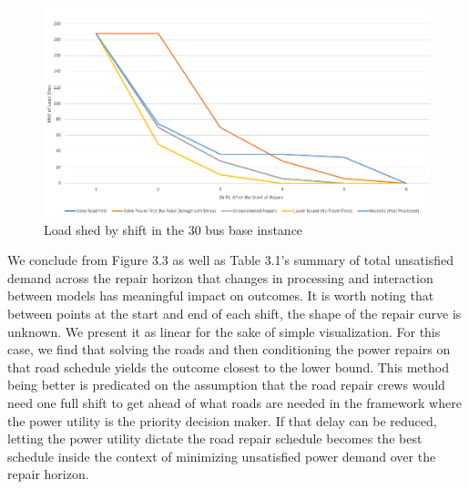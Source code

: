 \begin{figure}[htbp]
	\centering
	
	\includegraphics[width=.9\linewidth]{Rplot37.png}
	\caption{Load shed by shift in the 30 bus base instance}
	\label{fig:sub1}
\end{figure}
\begin{table}[htbp]
	\centering
	\caption{Total load shed over the repair horizon for the base instance}
	
	\label{time}
\end{table}
We conclude from Figure 3.3 as well as Table 3.1's summary of total unsatisfied demand across the repair horizon that changes in processing and interaction between models has meaningful impact on outcomes. It is worth noting that between points at the start and end of each shift, the shape of the repair curve is unknown. We present it as linear for the sake of simple visualization. For this case, we find that solving the roads and then conditioning the power repairs on that road schedule yields the outcome closest to the lower bound. This method being better is predicated on the assumption that the road repair crews would need one full shift to get ahead of what roads are needed in the framework where the power utility is the priority decision maker. If that delay can be reduced, letting the power utility dictate the road repair schedule becomes the best schedule inside the context of minimizing unsatisfied power demand over the repair horizon.


